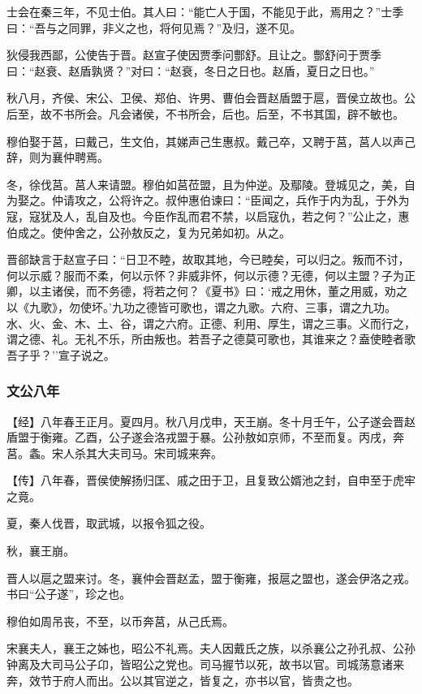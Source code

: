 \documentclass[]{article}
\begin{document}
士会在秦三年，不见士伯。其人曰：``能亡人于国，不能见于此，焉用之？''士季曰：``吾与之同罪，非义之也，将何见焉？''及归，遂不见。

狄侵我西鄙，公使告于晋。赵宣子使因贾季问酆舒。且让之。酆舒问于贾季曰：``赵衰、赵盾孰贤？''对曰：``赵衰，冬日之日也。赵盾，夏日之日也。''

秋八月，齐侯、宋公、卫侯、郑伯、许男、曹伯会晋赵盾盟于扈，晋侯立故也。公后至，故不书所会。凡会诸侯，不书所会，后也。后至，不书其国，辟不敏也。

穆伯娶于莒，曰戴己，生文伯，其娣声己生惠叔。戴己卒，又聘于莒，莒人以声己辞，则为襄仲聘焉。

冬，徐伐莒。莒人来请盟。穆伯如莒莅盟，且为仲逆。及鄢陵。登城见之，美，自为娶之。仲请攻之，公将许之。叔仲惠伯谏曰：``臣闻之，兵作于内为乱，于外为寇，寇犹及人，乱自及也。今臣作乱而君不禁，以启寇仇，若之何？''公止之，惠伯成之。使仲舍之，公孙敖反之，复为兄弟如初。从之。

晋郤缺言于赵宣子曰：``日卫不睦，故取其地，今已睦矣，可以归之。叛而不讨，何以示威？服而不柔，何以示怀？非威非怀，何以示德？无德，何以主盟？子为正卿，以主诸侯，而不务德，将若之何？《夏书》曰：`戒之用休，董之用威，劝之以《九歌》，勿使坏。'九功之德皆可歌也，谓之九歌。六府、三事，谓之九功。水、火、金、木、土、谷，谓之六府。正德、利用、厚生，谓之三事。义而行之，谓之德、礼。无礼不乐，所由叛也。若吾子之德莫可歌也，其谁来之？盍使睦者歌吾子乎？''宣子说之。

\hypertarget{header-n1138}{%
\subsubsection{文公八年}\label{header-n1138}}

【经】八年春王正月。夏四月。秋八月戊申，天王崩。冬十月壬午，公子遂会晋赵盾盟于衡雍。乙酉，公子遂会洛戎盟于暴。公孙敖如京师，不至而复。丙戌，奔莒。螽。宋人杀其大夫司马。宋司城来奔。

【传】八年春，晋侯使解扬归匡、戚之田于卫，且复致公婿池之封，自申至于虎牢之竟。

夏，秦人伐晋，取武城，以报令狐之役。

秋，襄王崩。

晋人以扈之盟来讨。冬，襄仲会晋赵孟，盟于衡雍，报扈之盟也，遂会伊洛之戎。书曰``公子遂''，珍之也。

穆伯如周吊丧，不至，以币奔莒，从己氏焉。

宋襄夫人，襄王之姊也，昭公不礼焉。夫人因戴氏之族，以杀襄公之孙孔叔、公孙钟离及大司马公子卬，皆昭公之党也。司马握节以死，故书以官。司城荡意诸来奔，效节于府人而出。公以其官逆之，皆复之，亦书以官，皆贵之也。
\end{document}
